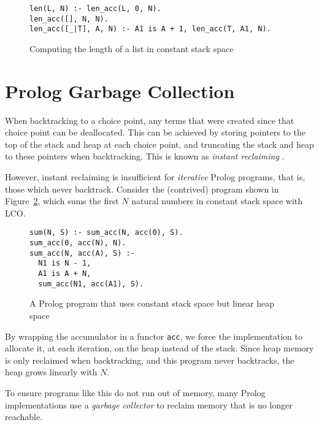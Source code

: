 \begin{figure}[H]
\begin{center}
\begin{verbatim}
len(L, N) :- len_acc(L, 0, N).
len_acc([], N, N).
len_acc([_|T], A, N) :- A1 is A + 1, len_acc(T, A1, N).
\end{verbatim}
\end{center}
\caption{Computing the length of a list in constant stack space}
\label{fig:lco}
\end{figure}

\section{Prolog Garbage Collection}

\label{sec:prolog-gc}

When backtracking to a choice point, any terms that were created since that choice point can be deallocated. This can be achieved by storing pointers to the top of the stack and heap at each choice point, and truncating the stack and heap to these pointers when backtracking. This is known as \emph{instant reclaiming} \cite{bekkersDynamicMemoryManagement1992}.

However, instant reclaiming is insufficient for \emph{iterative} Prolog programs, that is, those which never backtrack. Consider the (contrived) program shown in Figure~\ref{fig:iterative}, which sums the first $N$ natural numbers in constant stack space with LCO.

\begin{figure}[H]
\begin{center}
\begin{verbatim}
sum(N, S) :- sum_acc(N, acc(0), S).
sum_acc(0, acc(N), N).
sum_acc(N, acc(A), S) :-
  N1 is N - 1,
  A1 is A + N,
  sum_acc(N1, acc(A1), S).
\end{verbatim}
\end{center}
\caption{A Prolog program that uses constant stack space but linear heap space}
\label{fig:iterative}
\end{figure}

By wrapping the accumulator in a functor \texttt{acc}, we force the implementation to allocate it, at each iteration, on the heap instead of the stack. Since heap memory is only reclaimed when backtracking, and this program never backtracks, the heap grows linearly with $N$.

To ensure programs like this do not run out of memory, many Prolog implementations use a \emph{garbage collector} to reclaim memory that is no longer reachable.

